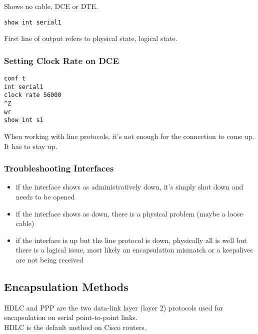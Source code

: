 Shows no cable, DCE or DTE.\\

\begin{verbatim}
show int serial1
\end{verbatim}

First line of output refers to physical state, logical state.

\subsubsection{Setting Clock Rate on DCE}

\begin{verbatim}
conf t
int serial1
clock rate 56000
^Z
wr
show int s1
\end{verbatim}

When working with line protocols, it's not enough for the connection to
come up. It has to stay up.\\

\subsubsection{Troubleshooting Interfaces}

\begin{itemize}

\item if the interface shows as administratively down, it's simply shut
down and needs to be opened

\item if the interface shows as down, there is a physical problem (maybe
a loose cable)

\item if the interface is up but the line protocol is down, physically
all is well but there is a logical issue, most likely an encapsulation
mismatch or a keepalives are not being received

\end{itemize}

\subsection{Encapsulation Methods}

HDLC and PPP are the two data-link layer (layer 2) protocols used for
encapsulation on serial point-to-point links.\\

HDLC is the default method on Cisco routers.\\

